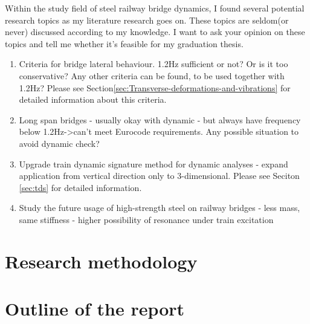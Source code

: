 





Within the study field of steel railway bridge dynamics, I found several potential research topics as my literature research goes on. These topics are seldom(or never) discussed according to my knowledge. I want to ask your opinion on these topics and tell me whether it's feasible for my graduation thesis. 

\begin{enumerate}
	\item Criteria for bridge lateral behaviour. 1.2Hz sufficient or not? Or is it too conservative? Any other criteria can be found, to be used together with 1.2Hz? Please see Section\ref{sec:Transverse-deformations-and-vibrations} for detailed information about this criteria.
	\item Long span bridges - usually okay with dynamic - but always have frequency below 1.2Hz->can't meet Eurocode requirements. Any possible situation to avoid dynamic check?
	\item Upgrade train dynamic signature method for dynamic analyses - expand application from vertical direction only to 3-dimensional. Please see Seciton \ref{sec:tds} for detailed information.
	\item Study the future usage of high-strength steel on railway bridges - less mass, same stiffness - higher possibility of resonance under train excitation
\end{enumerate}


\section{Research methodology}
\section{Outline of the report}

